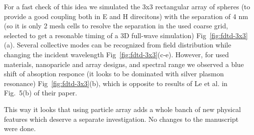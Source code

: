 \documentclass[a4paper]{article}
\begin{document}
For a fast check of this idea we simulated the 3x3 rectangular array
of spheres (to provide a good coupling both in E and H direcitons)
with the separation of 4 nm (so it is only 2 mesh cells to resolve the
separation in the used coarse grid, selected to get a resonable timing
of a 3D full-wave simulation) Fig~\ref{fig:fdtd-3x3}(a). Several
collective modes can be recognized from field distribution while
changing the incident wavelength Fig~\ref{fig:fdtd-3x3}(c-e). However,
for used materials, nanoparicle and array designs, and spectral range
we observed a blue shift of absoption responce (it looks to be
dominated with silver plasmon resonance) Fig~\ref{fig:fdtd-3x3}(b),
which is opposite to results of Le et al. in Fig.~5(b) of their paper.

This way it looks that using particle array adds a whole banch of new
physical features which deserve a separate investigation. No changes
to the manuscript were done.
\end{document}
